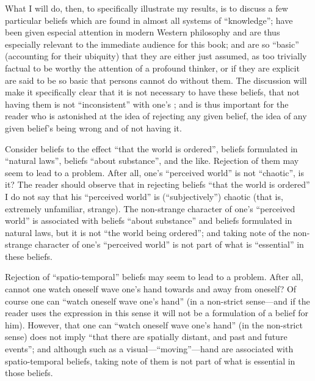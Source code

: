 What I will do, then, to specifically illustrate my results, is to discuss a 
few particular beliefs which are found in almost all systems of \enquote{knowledge}; 
have been given especial attention in modern Western philosophy and are 
thus especially relevant to the immediate audience for this book; and are so 
\enquote{basic} (accounting for their ubiquity) that they are either just assumed, as 
too trivially factual to be worthy the attention of a profound thinker, or if 
they are explicit are said to be so basic that persons cannot do without them. 
The discussion will make it specifically clear that it is not necessary to have 
these beliefs, that not having them is not \enquote{inconsistent} with one's 
; and is thus important for the reader who is astonished at the idea 
of rejecting any given belief, the idea of any given belief's being wrong and 
of not having it. 

Consider beliefs to the effect \enquote{that the world is ordered}, beliefs 
formulated in \enquote{natural laws}, beliefs \enquote{about substance}, and the like. 
Rejection of them may seem to lead to a problem. After all, one's \enquote{perceived 
world} is not \enquote{chaotic}, is it? The reader should observe that in rejecting 
beliefs \enquote{that the world is ordered} I do not say that his \enquote{perceived world} is 
(\enquote{subjectively}) chaotic (that is, extremely unfamiliar, strange). The 
non-strange character of one's \enquote{perceived world} is associated with beliefs 
\enquote{about substance} and beliefs formulated in natural laws, but it is not \enquote{the 
world being ordered}; and taking note of the non-strange character of one's 
\enquote{perceived world} is not part of what is \enquote{essential} in these beliefs. 

Rejection of \enquote{spatio-temporal} beliefs may seem to lead to a problem. 
After all, cannot one watch oneself wave one's hand towards and away from 
oneself? Of course one can \enquote{watch oneself wave one's hand} (in a non-strict 
sense---and if the reader uses the expression in this sense it will not be a 
formulation of a belief for him). However, that one can \enquote{watch oneself wave 
one's hand} (in the non-strict sense) does not imply \enquote{that there are spatially 
distant, and past and future events}; and although  such as a 
visual---\enquote{moving}---hand  are associated with spatio-temporal 
beliefs, taking note of them is not part of what is essential in those beliefs. 

